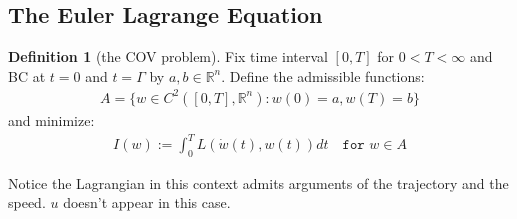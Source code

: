 \documentclass[a4paper,11pt,oneside,fleqn]{book}
\theoremstyle{definition}
\newtheorem{definition}{Definition}[section]
\theoremstyle{remark}
\begin{document}
\subsection{The Euler Lagrange Equation}
\begin{definition}[the COV problem]
	Fix time interval $[0, T]$ for $0 < T < \infty$ and BC at $t = 0$ and $t = \Gamma$ by $a, b \in \mathbb{R}^n$. Define the admissible functions:
	\begin{align*}
		A = \bigg\{ w \in C^2([0, T], \mathbb{R}^n): w(0) = a, w(T) = b \bigg\}
	\end{align*}
	and minimize:
	\begin{align*}
		I(w):= \int_0^T L(\dot{w}(t), w(t)) dt \quad \texttt{for } w \in A
	\end{align*}
\end{definition}

Notice the Lagrangian in this context admits arguments of the trajectory and the speed. $u$ doesn't appear in this case. 
\end{document}
